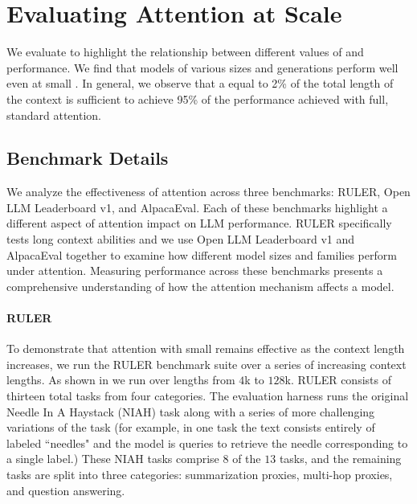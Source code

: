 \section{Evaluating \Topk Attention at Scale}
\label{experiments}

We evaluate \topk to highlight the relationship between different values of \kk and performance. We find that models of various sizes and generations perform well even at small \kk. In general, we observe that a \kk equal to 2\% of the total length of the context is sufficient to achieve 95\% of the performance achieved with full, standard attention.

\subsection{Benchmark Details}
We analyze the effectiveness of \topk attention across three benchmarks: RULER, Open LLM Leaderboard v1, and AlpacaEval. Each of these benchmarks highlight a different aspect of \topk attention impact on LLM performance. RULER specifically tests long context abilities and we use Open LLM Leaderboard v1 and AlpacaEval together to examine how different model sizes and families perform under \topk attention. Measuring performance across these benchmarks presents a comprehensive understanding of how the \topk attention mechanism affects a model. 

\paragraph{RULER} To demonstrate that \topk attention with small \kk remains effective as the context length increases, we run the RULER \citep{hsiehRULERWhatsReal2024} benchmark suite over a series of increasing context lengths. As shown in  we run over lengths from $4$k to $128$k. 
RULER consists of thirteen total tasks from four categories. The evaluation harness runs the original Needle In A Haystack (NIAH) \citep{kamradt2023needle} task along with a series of more challenging variations of the task (for example, in one task the text consists entirely of labeled ``needles" and the model is queries to retrieve the needle corresponding to a single label.) These NIAH tasks comprise $8$ of the $13$ tasks, and the remaining tasks are split into three categories: summarization proxies, multi-hop proxies, and question answering. 

